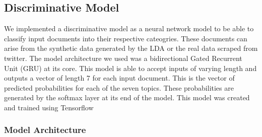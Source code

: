 \documentclass[11pt]{article}
\begin{document}
\subsection{Discriminative Model}
We implemented a discriminative model as a neural network model to be able to classify input documents into their respective cateogries. These documents can arise from the synthetic data generated by the LDA or the real data scraped from twitter. The model architecture we used was a bidirectional Gated Recurrent Unit (GRU) at its core. This model is able to accept inputs of varying length and outputs a vector of length 7 for each input document. This is the vector of predicted probabilities for each of the seven topics. These probabilities are generated by the softmax layer at its end of the model. This model was created and trained using Tensorflow \cite{tensorflow}


\subsubsection{Model Architecture}
\end{document}
